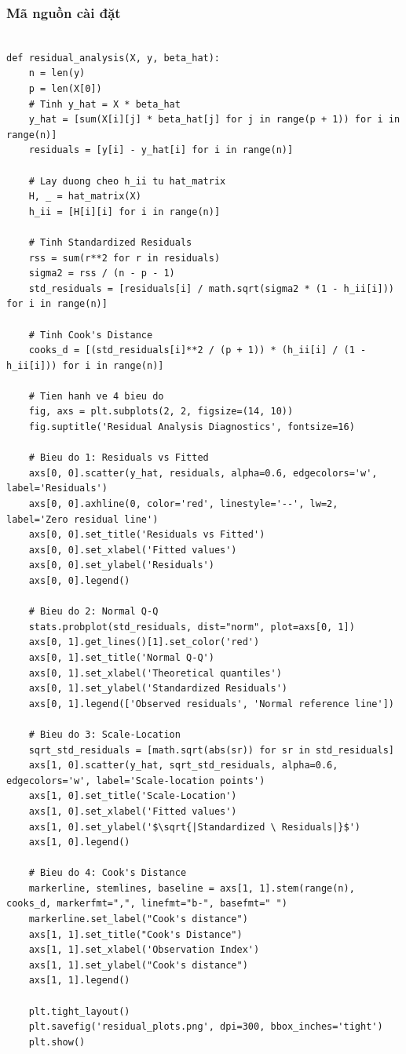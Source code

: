 \subsubsection{Mã nguồn cài đặt}

\begin{lstlisting}[style=Python, caption=Cài đặt hàm residual\_analysis]

def residual_analysis(X, y, beta_hat):
    n = len(y)
    p = len(X[0])
    # Tinh y_hat = X * beta_hat
    y_hat = [sum(X[i][j] * beta_hat[j] for j in range(p + 1)) for i in range(n)]
    residuals = [y[i] - y_hat[i] for i in range(n)]
    
    # Lay duong cheo h_ii tu hat_matrix
    H, _ = hat_matrix(X)
    h_ii = [H[i][i] for i in range(n)]
    
    # Tinh Standardized Residuals
    rss = sum(r**2 for r in residuals)
    sigma2 = rss / (n - p - 1)
    std_residuals = [residuals[i] / math.sqrt(sigma2 * (1 - h_ii[i])) for i in range(n)]
    
    # Tinh Cook's Distance
    cooks_d = [(std_residuals[i]**2 / (p + 1)) * (h_ii[i] / (1 - h_ii[i])) for i in range(n)]
    
    # Tien hanh ve 4 bieu do 
    fig, axs = plt.subplots(2, 2, figsize=(14, 10))
    fig.suptitle('Residual Analysis Diagnostics', fontsize=16)

    # Bieu do 1: Residuals vs Fitted
    axs[0, 0].scatter(y_hat, residuals, alpha=0.6, edgecolors='w', label='Residuals')
    axs[0, 0].axhline(0, color='red', linestyle='--', lw=2, label='Zero residual line')
    axs[0, 0].set_title('Residuals vs Fitted')
    axs[0, 0].set_xlabel('Fitted values')
    axs[0, 0].set_ylabel('Residuals')
    axs[0, 0].legend()

    # Bieu do 2: Normal Q-Q
    stats.probplot(std_residuals, dist="norm", plot=axs[0, 1])
    axs[0, 1].get_lines()[1].set_color('red')
    axs[0, 1].set_title('Normal Q-Q')
    axs[0, 1].set_xlabel('Theoretical quantiles')
    axs[0, 1].set_ylabel('Standardized Residuals')
    axs[0, 1].legend(['Observed residuals', 'Normal reference line'])

    # Bieu do 3: Scale-Location
    sqrt_std_residuals = [math.sqrt(abs(sr)) for sr in std_residuals]
    axs[1, 0].scatter(y_hat, sqrt_std_residuals, alpha=0.6, edgecolors='w', label='Scale-location points')
    axs[1, 0].set_title('Scale-Location')
    axs[1, 0].set_xlabel('Fitted values')
    axs[1, 0].set_ylabel('$\sqrt{|Standardized \ Residuals|}$')
    axs[1, 0].legend()

    # Bieu do 4: Cook's Distance
    markerline, stemlines, baseline = axs[1, 1].stem(range(n), cooks_d, markerfmt=",", linefmt="b-", basefmt=" ")
    markerline.set_label("Cook's distance")
    axs[1, 1].set_title("Cook's Distance")
    axs[1, 1].set_xlabel('Observation Index')
    axs[1, 1].set_ylabel("Cook's distance")
    axs[1, 1].legend()

    plt.tight_layout()
    plt.savefig('residual_plots.png', dpi=300, bbox_inches='tight')
    plt.show()
\end{lstlisting}

